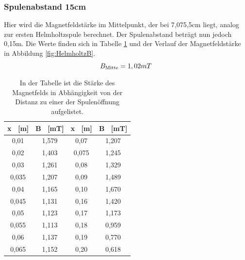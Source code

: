 \documentclass[titlepage = firstcover]{scrartcl}
\begin{document}
                \subsubsection{Spulenabstand 15cm}
                Hier wird die Magnetfeldstärke im Mittelpunkt, der bei 7,075,5cm liegt, analog zur ersten Helmholtzspule berechnet. Der Spulenabstand beträgt nun 
                jedoch 0,15m. Die Werte finden sich in Tabelle \ref{tab:HelmholtzB} und der Verlauf der Magnetfeldstärke in Abbildung \ref{fig:HelmholtzB}.
                \begin{equation}
                    B_{\text{Mitte}} = 1,02mT \\
                    \label{eqn:HelmB}
                \end{equation}
                \begin{table}[h]
                    \centering 
                    \caption{In der Tabelle ist die Stärke des Magnetfelds in Abhängigkeit von der Distanz zu einer der Spulenöffnung aufgelistet.}
                    \label{tab:HelmholtzB}
    
                    \begin{tabular}{c c c c}
                        \toprule
                        {x \ [m]} & {B \ [mT]} & {x \ [m]} & {B \ [mT]} \\
                        \midrule
                        0,01  & 1,579 & 0,07 & 1,207 \\
                        0,02  & 1,403 & 0,075 & 1,245 \\
                        0,03  & 1,261 & 0,08 & 1,329 \\
                        0,035 & 1,207 & 0,09 & 1,489 \\
                        0,04  & 1,165 & 0,10 & 1,670 \\
                        0,045 & 1,131 & 0,16 & 1,420 \\
                        0,05  & 1,123 & 0,17 & 1,173 \\
                        0,055 & 1,113 & 0,18 & 0,959 \\
                        0,06  & 1,137 & 0,19 & 0,770 \\
                        0,065 & 1,152 & 0,20 & 0,618 \\
                        \bottomrule
                    \end{tabular}                
                \end{table}
    
\end{document}
